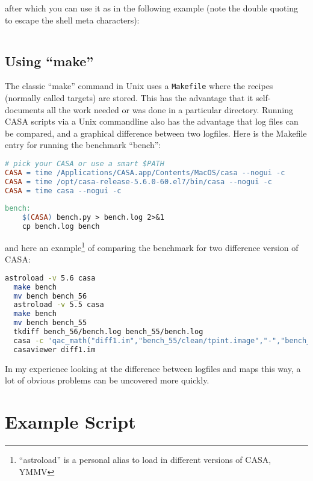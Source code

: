 \documentclass[12pt,a4paper]{article}
\begin{document}
after which you can use it as in the following example (note the double quoting to escape the shell meta characters):

\begin{lstlisting}[language=bash]
  % casa --nogui -c foo.py pdir='"test1"' imsize=1024 pixel=0.1 niter='[0,1000]'  >foo.log 2>&1
\end{lstlisting}

\subsection{Using ``make''}

The classic ``make'' command in Unix uses a \verb+Makefile+ where the recipes (normally called targets) are stored. This has the advantage that
it self-documents all the work needed or was done in a particular directory. Running CASA scripts via a Unix commandline also has the
advantage that log files can be compared, and a  graphical difference between two logfiles.
Here is the Makefile entry for running the benchmark ``bench'':

\begin{lstlisting}[language=make]
  # pick your CASA or use a smart $PATH
CASA = time /Applications/CASA.app/Contents/MacOS/casa --nogui -c
CASA = time /opt/casa-release-5.6.0-60.el7/bin/casa --nogui -c
CASA = time casa --nogui -c
  
bench:
    $(CASA) bench.py > bench.log 2>&1
    cp bench.log bench
\end{lstlisting}

and here an example\footnote{``astroload'' is a personal alias to load in different versions of CASA, YMMV} of comparing the
benchmark for two difference version of CASA:

\begin{lstlisting}[language=bash]
  astroload -v 5.6 casa
  make bench
  mv bench bench_56
  astroload -v 5.5 casa
  make bench
  mv bench bench_55
  tkdiff bench_56/bench.log bench_55/bench.log
  casa -c 'qac_math("diff1.im","bench_55/clean/tpint.image","-","bench_56/clean/tpint.image")'
  casaviewer diff1.im
\end{lstlisting}

In my experience looking at the difference between logfiles and maps this way, a lot of obvious problems can be uncovered more quickly.

\section{Example Script}
\end{document}
